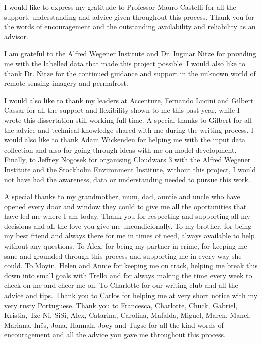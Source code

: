

\begin{ntacknowledgements}

I would like to express my gratitude to Professor Mauro Castelli for all the support, understanding and advice given throughout this process. Thank you for the words of encouragement and the outstanding availability and reliability as an advisor.

I am grateful to the Alfred Wegener Institute and Dr. Ingmar Nitze for providing me with the labelled data that made this project possible. I would also like to thank Dr. Nitze for the continued guidance and support in the unknown world of remote sensing imagery and permafrost.

I would also like to thank my leaders at Accenture, Fernando Lucini and Gilbert Cassar for all the support and flexibility shown to me this past year, while I wrote this dissertation still working full-time. A special thanks to Gilbert for all the advice and technical knowledge shared with me during the writing process. I would also like to thank Adam Wickenden for helping me with the input data collection and also for going through ideas with me on model development. Finally, to Jeffrey Nogosek for organising Cloudwars 3 with the Alfred Wegener Institute and the Stockholm Environment Institute, without this project, I would not have had the awareness, data or understanding needed to pursue this work.

A special thanks to my grandmother, mum, dad, auntie and uncle who have opened every door and window they could to give me all the oportunities that have led me where I am today. Thank you for respecting and supporting all my decisions and all the love you give me uncondicionally. To my brother, for being my best friend and always there for me in times of need, always available to help without any questions. To Alex, for being my partner in crime, for keeping me sane and grounded through this process and supporting me in every way she could. To Moyin, Helen and Annie for keeping me on track, helping me break this down into small goals with Trello and  for always making the time every week to check on me and cheer me on. To Charlotte for our writing club and all the advice and tips. Thank you to Carlos for helping me at very short notice with my very rusty Portuguese. Thank you to Francesca, Charlotte, Chuck, Gabriel, Kristia, Tze Ni, SiSi, Alex, Catarina, Carolina, Mafalda, Miguel, Maren, Manel, Mariana, Inês, Jona, Hannah, Joey and Tugse for all the kind words of encouragement and all the advice you gave me throughout this process.


\end{ntacknowledgements}
